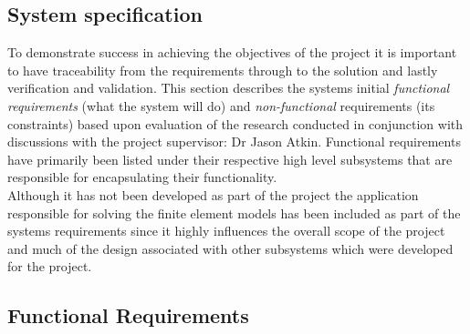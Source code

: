 \subsection{System specification}
To demonstrate success in achieving the objectives of the project it is important to have traceability from the requirements through to the solution and lastly verification and validation. This section describes the systems initial \textit{functional requirements} (what the system will do) and \textit{non-functional} requirements (its constraints) based upon evaluation of the research conducted in conjunction with discussions with the project supervisor: Dr Jason Atkin. Functional requirements have primarily been listed under their respective high level subsystems that are responsible for encapsulating their functionality. \\ 

\noindent
Although it has not been developed as part of the project the application responsible for solving the finite element models has been included as part of the systems requirements since it highly influences the overall scope of the project and much of the design associated with other subsystems which were developed for the project. \\ 

\subsection{Functional Requirements}

